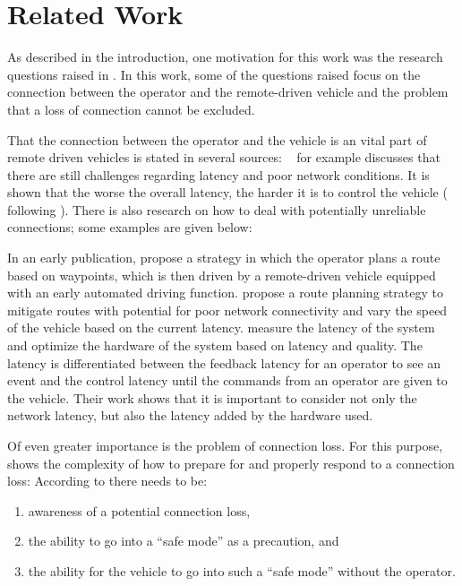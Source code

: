\section{Related Work}
As described in the introduction, one motivation for this work was the research questions raised in \cite{WG_Teleoperation2024_en}. 
In this work, some of the questions raised focus on the connection between the operator and the remote-driven vehicle and the problem that a loss of connection cannot be excluded. 

That the connection between the operator and the vehicle is an vital part of remote driven vehicles is stated in several sources:
\citeauthor{Zhang2020}~\cite{Zhang2020} for example discusses that there are still challenges regarding latency and poor network conditions.
It is shown that the worse the overall latency, the harder it is to control the vehicle (\cite{Zhang2020} following \cite{Sheridan1963, Luck2006, Chen2007, Davis2010, Gnatzig2013, Bodell2016, Liu2017}).
There is also research on how to deal with potentially unreliable connections; some examples are given below:

In an early publication, \textcite{Kay1995} propose a strategy in which the operator plans a route based on waypoints, which is then driven by a remote-driven vehicle equipped with an early automated driving function.
\textcite{Neumeier2019} propose a route planning strategy to mitigate routes with potential for poor network connectivity and vary the speed of the vehicle based on the current latency. 
\textcite{Georg2020} measure the latency of the system and optimize the hardware of the system based on latency and quality. 
The latency is differentiated between the feedback latency for an operator to see an event and the control latency until the commands from an operator are given to the vehicle.
Their work shows that it is important to consider not only the network latency, but also the latency added by the hardware used. 

Of even greater importance is the problem of connection loss.
For this purpose, \textcite{Zhang2020} shows the complexity of how to prepare for and properly respond to a connection loss:
According to \citeauthor{Zhang2020} there needs to be: 
\begin{enumerate}
    \item awareness of a potential connection loss,
    \item the ability to go into a ``safe mode'' as a precaution, and
    \item the ability for the vehicle to go into such a ``safe mode'' without the operator.
\end{enumerate}

